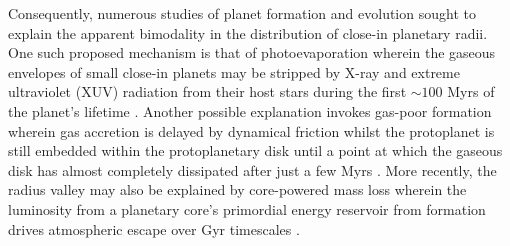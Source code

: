 \documentclass[twocolumn]{emulateapj}
\newcommand{\kepler}[1]{\emph{Kepler}#1}
\begin{document}

Consequently, numerous studies of planet formation and evolution sought to explain the
apparent bimodality in the distribution of close-in planetary radii. One such proposed mechanism is
that of photoevaporation wherein the gaseous envelopes of small close-in planets may be stripped by
X-ray and extreme ultraviolet (XUV) radiation from their host stars during the first $\sim 100$ Myrs
of the planet's lifetime %
\citep{owen13,jin14,lopez14,chen16,lopez18,owen17,jin18}. Another possible explanation
invokes gas-poor formation wherein gas accretion is delayed by dynamical friction whilst the
protoplanet is still embedded within the protoplanetary disk until a point at which the gaseous disk
has almost completely dissipated after just a few Myrs \citep{lee14,lee16,lopez18}. More recently,
the radius valley may also be explained by core-powered mass loss wherein the
luminosity from a planetary core's primordial energy reservoir from formation drives atmospheric escape
over Gyr timescales \citep{ginzburg18,gupta19a,gupta19b}.
\end{document}
